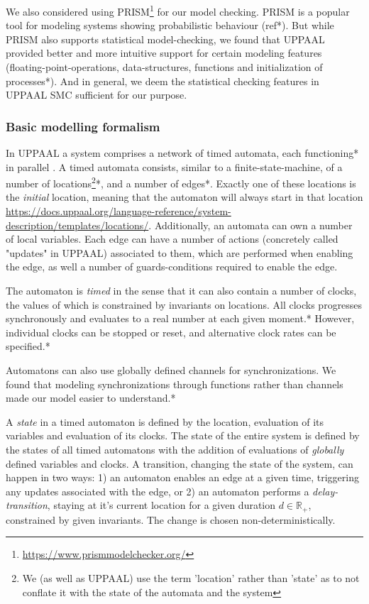 
We also considered using PRISM\footnote{\url{https://www.prismmodelchecker.org/}} for our model checking. PRISM is a popular tool for modeling systems showing probabilistic behaviour (ref*). But while PRISM also supports statistical model-checking, we found that UPPAAL provided better and more intuitive support for certain modeling features (floating-point-operations, data-structures, functions and initialization of processes*). And in general, we deem the statistical checking features in UPPAAL SMC sufficient for our purpose.

\subsubsection{Basic modelling formalism}

In UPPAAL a system comprises a network of timed automata, each functioning* in parallel \parencite[for a formal definition see:][]{UPPAALTutorial}. A timed automata consists, similar to a finite-state-machine, of a number of locations\footnote{We (as well as UPPAAL) use the term 'location' rather than 'state' as to not conflate it with the state of the automata and the system}*, and a number of edges*. Exactly one of these locations is the \textit{initial} location, meaning that the automaton will always start in that location \url{https://docs.uppaal.org/language-reference/system-description/templates/locations/}. Additionally, an automata can own a number of local variables.  Each edge can have a number of actions (concretely called "updates" in UPPAAL) associated to them, which are performed when enabling the edge, as well a number of guards-conditions required to enable the edge. 

The automaton is \textit{timed} in the sense that it can also contain a number of clocks, the values of which is constrained by invariants on locations. All clocks progresses synchronously and evaluates to a real number at each given moment.* However, individual clocks can be stopped or reset, and alternative clock rates can be specified.*

Automatons can also use globally defined channels for synchronizations. We found that modeling synchronizations through functions rather than channels made our model easier to understand.*

A \textit{state} in a timed automaton is defined by the location, evaluation of its variables and evaluation of its clocks. The state of the entire system is defined by the states of all timed automatons with the addition of evaluations of \textit{globally} defined variables and clocks. A transition, changing the state of the system, can happen in two ways: 1) an automaton enables an edge at a given time, triggering any updates associated with the edge, or 2) an automaton performs a \textit{delay-transition}, staying at it's current location for a given duration $d\in 
\mathds{R}_{+}$, constrained by given invariants. The change is chosen non-deterministically. 

